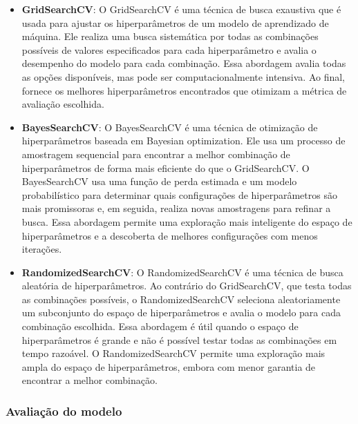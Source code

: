 \begin{itemize}
	\item \textbf{GridSearchCV}: O GridSearchCV é uma técnica de busca exaustiva que é usada para ajustar os hiperparâmetros de um modelo de aprendizado de máquina. Ele realiza uma busca sistemática por todas as combinações possíveis de valores especificados para cada hiperparâmetro e avalia o desempenho do modelo para cada combinação. Essa abordagem avalia todas as opções disponíveis, mas pode ser computacionalmente intensiva. Ao final, fornece os melhores hiperparâmetros encontrados que otimizam a métrica de avaliação escolhida.

\item \textbf{BayesSearchCV}: O BayesSearchCV é uma técnica de otimização de hiperparâmetros baseada em Bayesian optimization. Ele usa um processo de amostragem sequencial para encontrar a melhor combinação de hiperparâmetros de forma mais eficiente do que o GridSearchCV. O BayesSearchCV usa uma função de perda estimada e um modelo probabilístico para determinar quais configurações de hiperparâmetros são mais promissoras e, em seguida, realiza novas amostragens para refinar a busca. Essa abordagem permite uma exploração mais inteligente do espaço de hiperparâmetros e a descoberta de melhores configurações com menos iterações.

\item \textbf{RandomizedSearchCV}: O RandomizedSearchCV é uma técnica de busca aleatória de hiperparâmetros. Ao contrário do GridSearchCV, que testa todas as combinações possíveis, o RandomizedSearchCV seleciona aleatoriamente um subconjunto do espaço de hiperparâmetros e avalia o modelo para cada combinação escolhida. Essa abordagem é útil quando o espaço de hiperparâmetros é grande e não é possível testar todas as combinações em tempo razoável. O RandomizedSearchCV permite uma exploração mais ampla do espaço de hiperparâmetros, embora com menor garantia de encontrar a melhor combinação.
\end{itemize}

\subsubsection{Avalia\c c\~ao do modelo}

